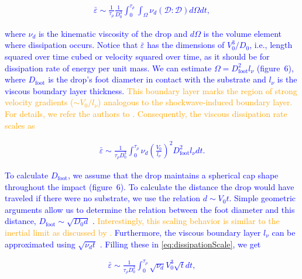 \documentclass[]{article}
\newcommand*\blue{\textcolor{blue}}
\newcommand{\VS}[1]{{\textcolor{orange}{#1}}}
\begin{document}
\begin{enumerate}
\begin{enumerate}
		\blue{\begin{align}
				\bar{\varepsilon} \sim \frac{1}{\tau_\rho}\frac{1}{D_0^3}\int_0^{\tau_\rho}\int_\Omega\nu_d\left(\boldsymbol{\mathcal{D}:\mathcal{D}}\right)d\Omega dt,
		\end{align}}
		
		\noindent \blue{where $\nu_d$ is the kinematic viscosity of the drop and $d\Omega$ is the volume element where dissipation occurs. Notice that $\bar{\varepsilon}$ has the dimensions of $V_0^3/D_0$, i.e., length squared over time cubed or velocity squared over time, as it should be for dissipation rate of energy per unit mass. We can estimate $\Omega = D_{\text{foot}}^2l_\nu$ (figure~6), where $D_{\text{foot}}$ is the drop's foot diameter in contact with the substrate and $l_\nu$ is the viscous boundary layer thickness.} \VS{This boundary layer marks the region of strong velocity gradients ($\sim V_0/l_\nu$) analogous to the \citet{mirels1955laminar} shockwave-induced boundary layer. For details, we refer the authors to \citet{schlichting2016boundary, Schroll2010, Philippi2016}. Consequently, the viscous dissipation rate scales as}
		
		\blue{\begin{align}\label{eq:dissipationScale}
				\bar{\varepsilon} \sim \frac{1}{\tau_\rho D_0^3}\int_0^{\tau_\rho}\nu_d \left(\frac{V_0}{l_\nu}\right)^2 D_{\text{foot}}^2l_\nu dt.
		\end{align}}
		
		\noindent \blue{To calculate $D_{\text{foot}}$, we assume that the drop maintains a spherical cap shape throughout the impact (figure~6). To calculate the distance the drop would have traveled if there were no substrate, we use the relation $d \sim V_0t$. Simple geometric arguments allow us to determine the relation between the foot diameter and this distance, $D_{\text{foot}} \sim \sqrt{D_0d}$ \citep{lesser1981analytic, mandre2009precursors,  zheng2021air, bilotto2023fluid, bertin2023similarity}.} \VS{Interestingly, this scaling behavior is similar to the inertial limit \citep{wagner1932stoss, Bouwhuis2012, Philippi2016, gordillo2019theory} as discussed by \citet{langley2017impact, bilotto2023fluid}.} \blue{Furthermore, the viscous boundary layer $l_\nu$ can be approximated using $\sqrt{\nu_d t}$ \citep{mirels1955laminar, Eggers2010, Philippi2016}. Filling these in \eqref{eq:dissipationScale}, we get}
		
		\blue{\begin{align}	
				\bar{\varepsilon} \sim \frac{1}{\tau_\rho D_0^2}\int_0^{\tau_\rho}\sqrt{\nu_d} V_0^3 \sqrt{t} dt,
		\end{align}}
		

\end{enumerate}
\end{enumerate}
\end{document}

